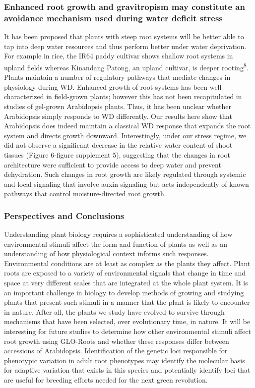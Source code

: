 \documentclass[]{article}
\begin{document}
\subsubsection{Enhanced root growth and gravitropism may constitute an
avoidance mechanism used during water deficit
stress}\label{enhanced-root-growth-and-gravitropism-may-constitute-an-avoidance-mechanism-used-during-water-deficit-stress}

It has been proposed that plants with steep root systems will be better
able to tap into deep water resources and thus perform better under
water deprivation. For example in rice, the IR64 paddy cultivar shows
shallow root systems in upland fields whereas Kinandang Patong, an
upland cultivar, is deeper rooting\textsuperscript{8}. Plants maintain a
number of regulatory pathways that mediate changes in physiology during
WD. Enhanced growth of root systems has been well characterized in
field-grown plants; however this has not been recapitulated in studies
of gel-grown Arabidopsis plants. Thus, it has been unclear whether
Arabidopsis simply responds to WD differently. Our results here show
that Arabidopsis does indeed maintain a classical WD response that
expands the root system and directs growth downward. Interestingly,
under our stress regime, we did not observe a significant decrease in
the relative water content of shoot tissues (Figure 6-figure supplement
5), suggesting that the changes in root architecture were sufficient to
provide access to deep water and prevent dehydration. Such changes in
root growth are likely regulated through systemic and local signaling
that involve auxin signaling but acts independently of known pathways
that control moisture-directed root growth.

\subsubsection{Perspectives and
Conclusions}\label{perspectives-and-conclusions}

Understanding plant biology requires a sophisticated understanding of
how environmental stimuli affect the form and function of plants as well
as an understanding of how physiological context informs such responses.
Environmental conditions are at least as complex as the plants they
affect. Plant roots are exposed to a variety of environmental signals
that change in time and space at very different scales that are
integrated at the whole plant system. It is an important challenge in
biology to develop methods of growing and studying plants that present
such stimuli in a manner that the plant is likely to encounter in
nature. After all, the plants we study have evolved to survive through
mechanisms that have been selected, over evolutionary time, in nature.
It will be interesting for future studies to determine how other
environmental stimuli affect root growth using GLO-Roots and whether
these responses differ between accessions of Arabidopsis. Identification
of the genetic loci responsible for phenotypic variation in adult root
phenotypes may identify the molecular basis for adaptive variation that
exists in this species and potentially identify loci that are useful for
breeding efforts needed for the next green revolution.
\end{document}
